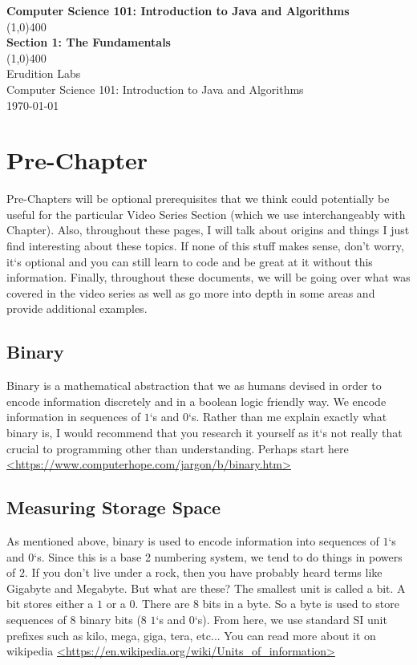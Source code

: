 \documentclass[11]{article}
\begin{document}
\begin{titlepage}
\begin{center}
\vspace{1cm}
\Large{\textbf{Computer Science 101: Introduction to Java and Algorithms}}\\
\vfill
\line(1,0){400}\\
\huge{\textbf{Section 1: The Fundamentals}}\\
\line(1,0){400}\\
\vfill
Erudition Labs\\
Computer Science 101: Introduction to Java and Algorithms\\
\today\\
\end{center}
\end{titlepage}

\tableofcontents
\thispagestyle{empty}
\clearpage
\setcounter{page}{1}

\section{Pre-Chapter}
Pre-Chapters will be optional prerequisites that we think could potentially be useful for the particular Video Series Section (which we use interchangeably with Chapter). Also, throughout these pages, I will talk about origins and things I just find interesting about these topics. If none of this stuff makes sense, don't worry, it`s optional and you can still learn to code and be great at it without this information. Finally, throughout these documents, we will be going over what was covered in the video series as well as go more into depth in some areas and provide additional examples.

\subsection{Binary}
Binary is a mathematical abstraction that we as humans devised in order to encode information discretely and in a boolean logic friendly way. We encode information in sequences of $1$`s and $0$`s. Rather than me explain exactly what binary is, I would recommend that you research it yourself as it`s not really that crucial to programming other than understanding. Perhaps start here \url{<https://www.computerhope.com/jargon/b/binary.htm>}

\subsection{Measuring Storage Space}
As mentioned above, binary is used to encode information into sequences of $1$`s and $0$`s. Since this is a base 2 numbering system, we tend to do things in powers of $2$. If you don't live under a rock, then you have probably heard terms like Gigabyte and Megabyte. But what are these? The smallest unit is called a bit. A bit stores either a $1$ or a $0$. There are 8 bits in a byte. So a byte is used to store sequences of 8 binary bits (8 $1$`s and $0$`s). From here, we use standard SI unit prefixes such as kilo, mega, giga, tera, etc... You can read more about it on wikipedia \url{<https://en.wikipedia.org/wiki/Units_of_information>}\\
\end{document}
